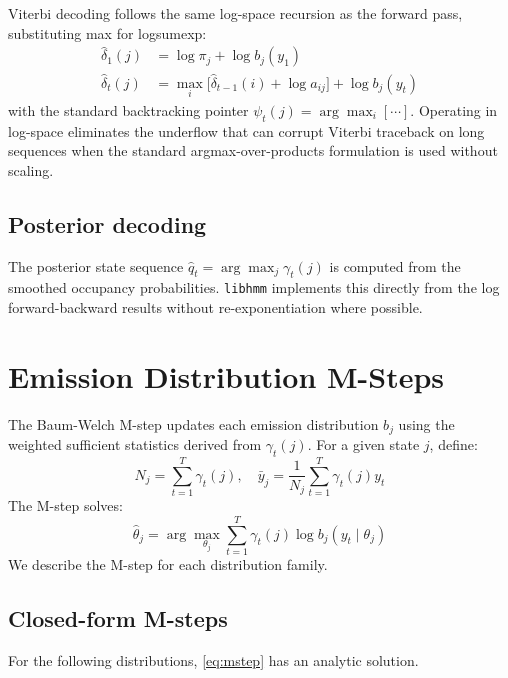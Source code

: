 \documentclass[11pt]{article}
\begin{document}
Viterbi decoding \citep{Viterbi1967} follows the same log-space recursion
as the forward pass, substituting max for logsumexp:
\begin{align}
  \hat{\delta}_1(j) &= \log \pi_j + \log b_j(y_1) \\
  \hat{\delta}_t(j) &= \max_i\bigl[\hat{\delta}_{t-1}(i)
    + \log a_{ij}\bigr] + \log b_j(y_t)
\end{align}
with the standard backtracking pointer $\psi_t(j) = \arg\max_i [\cdots]$.
Operating in log-space eliminates the underflow that can corrupt Viterbi
traceback on long sequences when the standard argmax-over-products formulation
is used without scaling.

\subsection{Posterior decoding}

The posterior state sequence $\hat{q}_t = \arg\max_j \gamma_t(j)$ is
computed from the smoothed occupancy probabilities.
\texttt{libhmm} implements this directly from the log forward-backward
results without re-exponentiation where possible.

\section{Emission Distribution M-Steps}
\label{sec:msteps}

The Baum-Welch M-step updates each emission distribution $b_j$ using the
weighted sufficient statistics derived from $\gamma_t(j)$.
For a given state $j$, define:
\begin{equation}
  N_j = \sum_{t=1}^T \gamma_t(j), \quad
  \bar{y}_j = \frac{1}{N_j} \sum_{t=1}^T \gamma_t(j) y_t
\end{equation}
The M-step solves:
\begin{equation}
  \hat{\theta}_j = \arg\max_{\theta_j}
    \sum_{t=1}^T \gamma_t(j) \log b_j(y_t \mid \theta_j)
  \label{eq:mstep}
\end{equation}
We describe the M-step for each distribution family.

\subsection{Closed-form M-steps}

For the following distributions, \eqref{eq:mstep} has an analytic solution.
\end{document}
